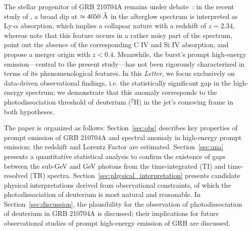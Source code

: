 \documentclass[linenumbers,twocolumn]{aastex631}
\begin{document}

The stellar progenitor of GRB 210704A remains under debate~\citep{2021GCN.30380....1M,2023MNRAS.522.5204B,2026MNRAS.548ag555P}: in the recent study of \cite{2026MNRAS.548ag555P}, a broad dip at $\approx 4050~\mathring{\rm A}$ in the afterglow spectrum is interpreted as Ly-$\alpha$ absorption, which implies a collapsar nature with a redshift of $z = 2.34$, whereas \cite{2023MNRAS.522.5204B} note that this feature occurs in a rather noisy part of the spectrum, point out the absence of the corresponding C IV and Si IV absorption, and propose a merger origin with $z<0.4$. Meanwhile, the burst's prompt high-energy emission---central to the present study---has not been rigorously characterized in terms of its phenomenological features. In this \textit{Letter}, we focus exclusively on data-driven observational findings, i.e. the statistically significant gap in the high-energy spectrum; we demonstrate that this anomaly corresponds to the photodissociation threshold of deuterium ($^2$H) in the jet's comoving frame in both hypotheses.








The paper is organized as follows: Section~\ref{sec:obs} describes key properties of prompt emission of GRB 210704A and spectral anomaly in high-energy prompt emission; the redshift and Lorentz Factor are estimated. Section~\ref{sec:ana} presents a quantitative statistical analysis to confirm the existence of gaps between the sub-GeV and GeV photons from the time-integrated (TI) and time-resolved (TR) spectra. Section~\ref{sec:physical_interpretation} presents candidate physical interpretations derived from observational constraints, of which the photodissociation of deuterium is most natural and reasonable. In Section~\ref{sec:discussion}, the plausibility for the observation of photodissociation of deuterium in GRB 210704A is discussed; their implications for future observational studies of prompt high-energy emission of GRB are discussed.
\end{document}
